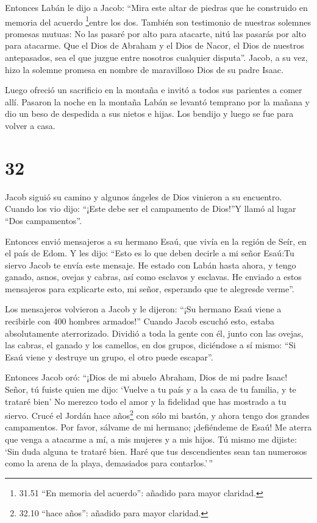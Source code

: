 Entonces Labán le dijo a Jacob: ``Mira este altar de
piedras que he construido en memoria del acuerdo \footnote{31.51 ``En
  memoria del acuerdo'': añadido para mayor claridad.}entre los dos.
 También son testimonio de nuestras solemnes promesas
mutuas: No las pasaré por alto para atacarte, nitú las pasarás por alto
para atacarme.  Que el Dios de Abraham y el Dios de Nacor,
el Dios de nuestros antepasados, sea el que juzgue entre nosotros
cualquier disputa''. Jacob, a su vez, hizo la solemne promesa en nombre
de maravilloso Dios de su padre Isaac.

 Luego ofreció un sacrificio en la montaña e invitó a todos
sus parientes a comer allí. Pasaron la noche en la montaña 
Labán se levantó temprano por la mañana y dio un beso de despedida a sus
nietos e hijas. Los bendijo y luego se fue para volver a casa.

\hypertarget{section-31}{%
\section{32}\label{section-31}}

 Jacob siguió su camino y algunos ángeles de Dios vinieron a
su encuentro.  Cuando los vio dijo: ``¡Este debe ser el
campamento de Dios!''Y llamó al lugar ``Dos campamentos''.

 Entonces envió mensajeros a su hermano Esaú, que vivía en
la región de Seír, en el país de Edom.  Y les dijo: ``Esto
es lo que deben decirle a mi señor Esaú:Tu siervo Jacob te envía este
mensaje. He estado con Labán hasta ahora,  y tengo ganado,
asnos, ovejas y cabras, así como esclavos y esclavas. He enviado a estos
mensajeros para explicarte esto, mi señor, esperando que te alegresde
verme''.

 Los mensajeros volvieron a Jacob y le dijeron: ``¡Su
hermano Esaú viene a recibirle con 400 hombres armados!'' 
Cuando Jacob escuchó esto, estaba absolutamente aterrorizado. Dividió a
toda la gente con él, junto con las ovejas, las cabras, el ganado y los
camellos, en dos grupos,  diciéndose a sí mismo: ``Si Esaú
viene y destruye un grupo, el otro puede escapar''.

 Entonces Jacob oró: ``¡Dios de mi abuelo Abraham, Dios de
mi padre Isaac! Señor, tú fuiste quien me dijo: `Vuelve a tu país y a la
casa de tu familia, y te trataré bien'  No merezco todo el
amor y la fidelidad que has mostrado a tu siervo. Crucé el Jordán hace
años\footnote{32.10 ``hace años'': añadido para mayor claridad.} con
sólo mi bastón, y ahora tengo dos grandes campamentos.  Por
favor, sálvame de mi hermano; ¡defiéndeme de Esaú! Me aterra que venga a
atacarme a mí, a mis mujeres y a mis hijos.  Tú mismo me
dijiste: `Sin duda alguna te trataré bien. Haré que tus descendientes
sean tan numerosos como la arena de la playa, demasiados para
contarlos.'\,''

